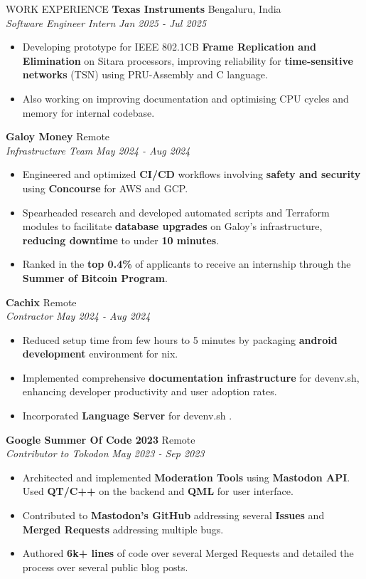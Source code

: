 \documentclass{resume} %
\begin{document}
\begin{rSection}{WORK EXPERIENCE}
	\textbf{Texas Instruments} \hfill Bengaluru, India\\
	\textit{Software Engineer Intern} \hfill \textit{Jan 2025 - Jul 2025}
	\begin{itemize}
		\item Developing prototype for IEEE 802.1CB \textbf{Frame Replication and Elimination} on Sitara processors, improving reliability for \textbf{time-sensitive networks} (TSN) using PRU-Assembly and C language.
		\item Also working on improving documentation and optimising CPU cycles and memory for internal codebase.
	\end{itemize}
	\textbf{Galoy Money} \hfill Remote\\
	\textit{Infrastructure Team} \hfill \textit{May 2024 - Aug 2024}
	\begin{itemize}
		\itemsep -1pt {}
		\item Engineered and optimized \textbf{CI/CD} workflows involving \textbf{safety and security} using \textbf{Concourse} for AWS and GCP.
		\item Spearheaded research and developed automated scripts and Terraform modules to facilitate \textbf{database upgrades} on Galoy's infrastructure, \textbf{reducing downtime} to under \textbf{10 minutes}.
		\item Ranked in the \textbf{top 0.4\%} of applicants to receive an internship through the \textbf{Summer of Bitcoin Program}.
	\end{itemize}

	\textbf{Cachix} \hfill Remote\\
	\textit{Contractor} \hfill \textit{May 2024 - Aug 2024}
	\begin{itemize}
		\itemsep -0.2pt {}
		\item Reduced setup time from few hours to 5 minutes by packaging \textbf{android development} environment for nix.
		\item Implemented comprehensive \textbf{documentation infrastructure} for devenv.sh, enhancing developer productivity and user adoption rates.
		\item Incorporated \textbf{Language Server} for devenv.sh .
	\end{itemize}

	\textbf{Google Summer Of Code 2023} \hfill Remote\\
	\textit{Contributor to Tokodon} \hfill \textit{May 2023 - Sep 2023}
	\begin{itemize}
		\itemsep -1pt {}
		\item Architected and implemented \textbf{Moderation Tools} using \textbf{Mastodon API}. Used \textbf{QT/C++} on the backend and \textbf{QML} for user interface.
		\item Contributed to \textbf{Mastodon's GitHub} addressing several \textbf{Issues} and \textbf{Merged Requests} addressing multiple bugs.
		\item Authored \textbf{6k+ lines} of code over several Merged Requests and detailed the process over several public blog posts.
	\end{itemize}

\end{rSection}
\end{document}
